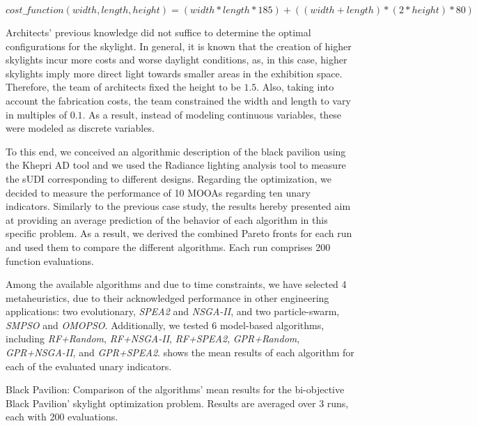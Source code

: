 \begin{equation} \label{eq:costanalysis}
cost\_function(width, length, height) = (width * length * 185) + ((width + length) * ( 2 * height) * 80)
\end{equation}

Architects' previous knowledge did not suffice to determine the optimal configurations for the skylight. In general, it is known that the creation of higher skylights incur more costs and worse daylight conditions, as, in this case, higher skylights imply more direct light towards smaller areas in the exhibition space. Therefore, the team of architects fixed the height to be $1.5$\metre. Also, taking into account the fabrication costs, the team constrained the width and length to vary in multiples of $0.1$\metre. As a result, instead of modeling continuous variables, these were modeled as discrete variables.

To this end, we conceived an algorithmic description of the black pavilion using the Khepri \ac{AD} tool and we used the Radiance lighting analysis tool to measure the \ac{sUDI} corresponding to different designs. Regarding the optimization, we decided to measure the performance of 10 \acp{MOOA} regarding ten unary indicators. Similarly to the previous case study, the results hereby presented aim at providing an average prediction of the behavior of each algorithm in this specific problem. As a result, we derived the combined Pareto fronts for each run and used them to compare the different algorithms. Each run comprises 200 function evaluations.

Among the available algorithms and due to time constraints, we have selected 4 metaheuristics, due to their acknowledged performance in other engineering applications: two evolutionary, \textit{\ac{SPEA2}} and \textit{\ac{NSGA-II}}, and two particle-swarm, \textit{SMPSO} and \textit{OMOPSO}. Additionally, we tested 6 model-based algorithms, including \textit{RF+Random}, \textit{RF+NSGA-II}, \textit{RF+SPEA2}, \textit{GPR+Random}, \textit{GPR+NSGA-II}, and \textit{GPR+SPEA2}.  shows the mean results of each algorithm for each of the evaluated unary indicators. 

\begin{table}[htbp]
	\centering
	\caption[Black Pavilion: Mean performance values of the algorithms' results]{Black Pavilion: Comparison of the algorithms' mean results for the bi-objective Black Pavilion' skylight optimization problem. Results are averaged over 3 runs, each with 200 evaluations.}
	\label{table:blackpavilion}
\end{table}

